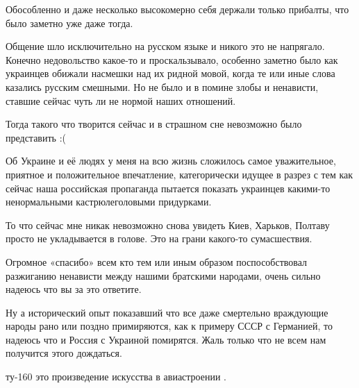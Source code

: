 \begin{itemize}
\begin{multicols}{2}
Обособленно и даже несколько высокомерно себя держали только прибалты, что было
заметно уже даже тогда. 

Общение шло исключительно на русском языке и никого это не напрягало. Конечно
недовольство какое-то и проскальзывало, особенно заметно было как украинцев
обижали насмешки над их ридной мовой, когда те или иные слова казались русским
смешными. Но не было и в помине злобы и ненависти, ставшие сейчас чуть ли не
нормой наших отношений.

Тогда такого что творится сейчас и в страшном сне невозможно было представить
:(

Об Украине и её людях у меня на всю жизнь сложилось самое уважительное,
приятное и положительное впечатление, категорически идущее в разрез с тем как
сейчас наша российская пропаганда пытается показать украинцев какими-то
ненормальными  кастрюлеголовыми придурками. 

То что сейчас мне никак невозможно снова увидеть Киев, Харьков, Полтаву просто
не укладывается в голове. Это на грани какого-то сумасшествия. 

Огромное «спасибо» всем кто тем или иным образом поспособствовал разжиганию
ненависти между нашими братскими народами, очень сильно надеюсь что вы за это
ответите. 

Ну а исторический опыт показавший что все даже смертельно враждующие народы
рано или поздно примиряются, как к примеру СССР с Германией, то надеюсь что и
Россия с Украиной помирятся. Жаль только что не всем нам получится этого
дождаться.


ту-160 это произведение искусства в авиастроении .

\endgroup

\end{multicols}

\end{itemize} %

